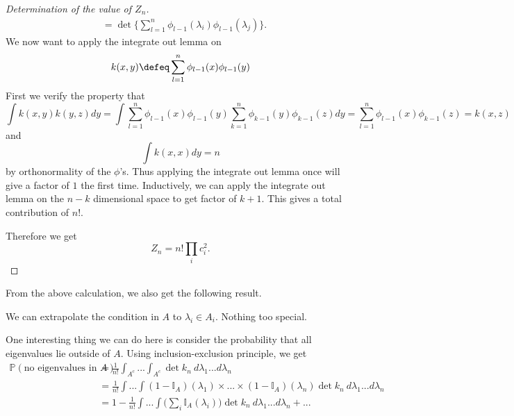 \begin{proof}[Determination of the value of $Z_n$]
\begin{align*}
    &= \det \{\sum_{l=1}^{n}\phi_{l-1}(\lambda_i)\phi_{l-1}(\lambda_j)\}.
\end{align*}
We now want to apply the integrate out lemma on \[
k(x,y) \defeq \sum_{l=1}^{n}\phi_{l-1}(x)\phi_{l-1}(y)
\]
First we verify the property that \[
\int k(x,y)k(y,z) dy = \int \sum_{l=1}^{n}\phi_{l-1}(x)\phi_{l-1}(y) \sum_{k=1}^{n}\phi_{k-1}(y)\phi_{k-1}(z) dy = \sum_{l=1}^{n}\phi_{l-1}(x)\phi_{k-1}(z) = k(x,z)
\] 
and \[
\int k(x,x) dy = n
\]
by orthonormality of the $\phi$'s.
Thus applying the integrate out lemma once will give a factor of $1$ the first time. Inductively, we can apply the integrate out lemma on the $n-k$ dimensional space to get factor of $k+1$. This gives a total contribution of $n!$.

Therefore we get \[
Z_n=n! \prod_i c_i^2.
\]
\end{proof}


From the above calculation, we also get the following result.

\begin{remark}
    We can extrapolate the condition in $A$ to $\lambda_i\in A_i$. Nothing too special.
\end{remark}

One interesting thing we can do here is consider the probability that all eigenvalues lie outside of $A$. Using inclusion-exclusion principle, we get \begin{align*}
    \mathbb{P}(\text{no eigenvalues in }A) &=
    \frac{1}{n!}\int_{A^c}...\int_{A^c} \det k_n \  d\lambda_1 ...d\lambda_n \\
    &=\frac{1}{n!} \int ... \int (1-\mathbb{I}_A)(\lambda_1) \times ... \times (1-\mathbb{I}_A)(\lambda_n) \det k_n \ d\lambda_1...d\lambda_n\\
    &=1 - \frac{1}{n!} \int ... \int \Big(\sum_i \mathbb{I}_A(\lambda_i)\Big) \det k_n \  d\lambda_1... d\lambda_n + ...
\end{align*}

